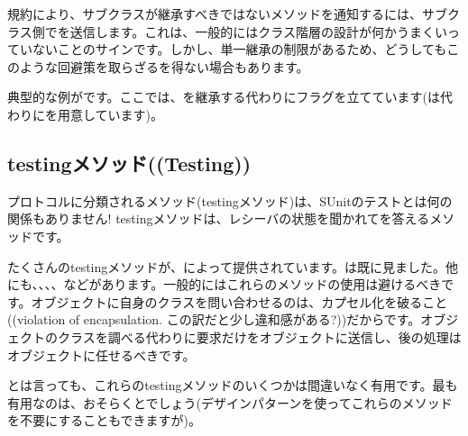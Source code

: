 \documentclass[a4paper,10pt,twoside]{book}
\begin{document}
規約により、サブクラスが継承すべきではないメソッドを通知するには、サブクラス側でを送信します。これは、一般的にはクラス階層の設計が何かうまくいっていないことのサインです。しかし、単一継承の制限があるため、どうしてもこのような回避策を取らざるを得ない場合もあります。

典型的な例がです。ここでは、を継承する代わりにフラグを立てています(は代わりにを用意しています)。



\subsection{testingメソッド((Testing))}

 プロトコルに分類されるメソッド(testingメソッド)は、SUnitのテストとは何の関係もありません! testingメソッドは、レシーバの状態を聞かれてを答えるメソッドです。

たくさんのtestingメソッドが、によって提供されています。は既に見ました。他にも、、、、などがあります。一般的にはこれらのメソッドの使用は避けるべきです。オブジェクトに自身のクラスを問い合わせるのは、カプセル化を破ること((violation of encapsulation. この訳だと少し違和感がある?))だからです。オブジェクトのクラスを調べる代わりに要求だけをオブジェクトに送信し、後の処理はオブジェクトに任せるべきです。

とは言っても、これらのtestingメソッドのいくつかは間違いなく有用です。最も有用なのは、おそらくとでしょう(\cite{Wool98a}デザインパターンを使ってこれらのメソッドを不要にすることもできますが)。

\end{document}
